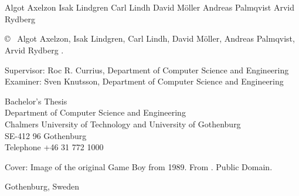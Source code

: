 \newpage
\thispagestyle{plain}
\vspace*{4.5cm}
\oneLineTitle\\
\oneLineSubtitle\\ %
Algot Axelzon \setlength{\parskip}{1cm}
Isak Lindgren \setlength{\parskip}{1cm}
Carl Lindh \setlength{\parskip}{1cm}
David Möller \setlength{\parskip}{1cm}
Andreas Palmqvist \setlength{\parskip}{1cm}
Arvid Rydberg \setlength{\parskip}{1cm}

\copyright ~ Algot Axelzon, Isak Lindgren, Carl Lindh, David Möller, Andreas Palmqvist, Arvid Rydberg \the\year. \setlength{\parskip}{1cm}

Supervisor: Roc R. Currius, Department of Computer Science and Engineering\\
Examiner: Sven Knutsson, Department of Computer Science and Engineering \setlength{\parskip}{1cm}

Bachelor's Thesis \the\year\\	%
Department of Computer Science and Engineering\\
Chalmers University of Technology and University of Gothenburg\\
SE-412 96 Gothenburg\\
Telephone +46 31 772 1000 \setlength{\parskip}{0.5cm}

\vfill
Cover: Image of the original Game Boy from 1989. From \cite{OriginalGameBoy}. Public Domain.


Gothenburg, Sweden \the\year

